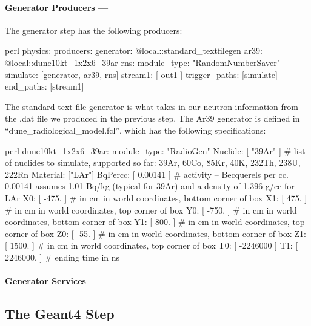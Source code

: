 \documentclass[8pt]{refart}
\begin{document}
\paragraph{Generator Producers ---}
The generator step has the following producers:
\begin{code}{perl}
physics:
{
    producers:  
    {
        generator:       @local::standard_textfilegen
        ar39:            @local::dune10kt_1x2x6_39ar
        rns:             { module_type: "RandomNumberSaver" }
    }
    simulate: [generator, ar39, rns]
    stream1:  [ out1 ]
    trigger_paths: [simulate] 
    end_paths:     [stream1]  
}
\end{code}
The standard text-file generator is what takes in our neutron information from the .dat file we produced in the previous step.  The Ar39 generator is defined in ``dune\_radiological\_model.fcl'', which has the following specifications:
\begin{code}{perl}
dune10kt_1x2x6_39ar:
{
 module_type:  "RadioGen"
 Nuclide:   [ "39Ar" ]    # list of nuclides to simulate, supported so far: 39Ar, 60Co, 85Kr, 40K, 232Th, 238U, 222Rn
 Material:  ["LAr"]
 BqPercc:   [ 0.00141 ]   # activity -- Becquerels per cc. 0.00141 assumes 1.01 Bq/kg (typical for 39Ar) and a density of 1.396 g/cc for LAr
 X0:        [ -475. ]     # in cm in world coordinates, bottom corner of box
 X1:        [  475. ]     # in cm in world coordinates, top corner of box
 Y0:        [ -750. ]     # in cm in world coordinates, bottom corner of box
 Y1:        [  800. ]     # in cm in world coordinates, top corner of box
 Z0:        [  -55. ]     # in cm in world coordinates, bottom corner of box
 Z1:        [  1500. ]     # in cm in world coordinates, top corner of box
 T0:        [ -2246000 ]
 T1:        [  2246000. ] # ending time in ns
}
\end{code}

\paragraph{Generator Services ---}

\subsection{The Geant4 Step}
\end{document}

